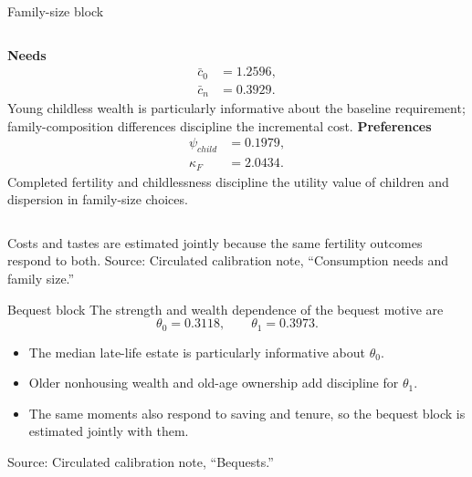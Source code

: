 \documentclass[aspectratio=169,11pt]{beamer}
\newcommand{\source}[1]{\vfill{\color{Muted}\tiny Source: #1}}
\newcommand{\tightitems}{\setlength{\itemsep}{0.55em}}
\begin{document}
\begin{frame}{Family-size block}
  \small
  \begin{columns}[T,onlytextwidth]
      \large\textbf{Needs}
      \[
      \begin{aligned}
        \bar c_0&=1.2596,\\
        \bar c_n&=0.3929.
      \end{aligned}
      \]
      Young childless wealth is particularly informative about the baseline requirement; family-composition differences discipline the incremental cost.
      \large\textbf{Preferences}
      \[
      \begin{aligned}
        \psi_{child}&=0.1979,\\
        \kappa_F&=2.0434.
      \end{aligned}
      \]
      Completed fertility and childlessness discipline the utility value of children and dispersion in family-size choices.
  \end{columns}

  \vspace{0.6em}
  Costs and tastes are estimated jointly because the same fertility outcomes respond to both.
  \source{Circulated calibration note, ``Consumption needs and family size.''}
\end{frame}

\begin{frame}{Bequest block}
  \large
  The strength and wealth dependence of the bequest motive are
  \[
    \theta_0=0.3118,
    \qquad
    \theta_1=0.3973.
  \]

  \begin{itemize}\tightitems
    \item The median late-life estate is particularly informative about $\theta_0$.
    \item Older nonhousing wealth and old-age ownership add discipline for $\theta_1$.
    \item The same moments also respond to saving and tenure, so the bequest block is estimated jointly with them.
  \end{itemize}
  \source{Circulated calibration note, ``Bequests.''}
\end{frame}
\end{document}
